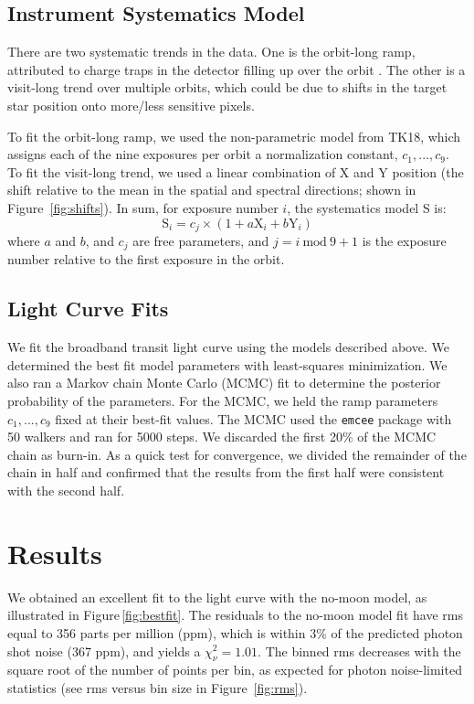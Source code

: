 \documentclass[twocolumn]{aastex62}
\newcommand{\Mod}[1]{\ \mathrm{mod}\ #1}
\begin{document}
\subsection{Instrument Systematics Model}
There are two systematic trends in the data. One is the orbit-long ramp, attributed to charge traps in the detector filling up over the orbit \citep{zhou17}. The other is a visit-long trend over multiple orbits, which could be due to shifts in the target star position onto more/less sensitive pixels.

To fit the orbit-long ramp, we used the non-parametric model from TK18, which assigns each of the nine exposures per orbit a normalization constant, $c_1, ..., c_9$. To fit the visit-long trend, we used a linear combination of X and Y position (the shift relative to the mean in the spatial and spectral directions; shown in Figure~\ref{fig:shifts}).  In sum, for exposure number $i$, the systematics model S is:
\begin{equation}
\label{eq:sys}
    \mathrm{S}_i = c_{j}\times(1 + a\mathrm{X}_i + b\mathrm{Y}_i) 
\end{equation}
where $a$ and $b$, and $c_j$ are free parameters, and $j = i\Mod9 + 1$ is the exposure number relative to the first exposure in the orbit.


\subsection{Light Curve Fits}
We fit the broadband transit light curve using the models described above.  We determined the best fit model parameters with least-squares minimization.  We also ran a Markov chain Monte Carlo (MCMC) fit to determine the posterior probability of the parameters. For the MCMC, we held the ramp parameters $c_1, ..., c_9$ fixed at their best-fit values.  The MCMC used the \texttt{emcee} package \citep{foremanmackey13} with 50 walkers and ran for 5000 steps. We discarded the first 20\% of the MCMC chain as burn-in. As a quick test for convergence, we divided the remainder of the chain in half and confirmed that the results from the first half were consistent with the second half.


\section{Results}
We obtained an excellent fit to the light curve with the no-moon model, as illustrated in  Figure\,\ref{fig:bestfit}. The residuals to the no-moon model fit have rms equal to 356 parts per million (ppm), which is within 3\% of the predicted photon shot noise (367 ppm), and yields a $\chi_\nu^2 = 1.01$. The binned rms decreases with the square root of the number of points per bin, as expected for photon noise-limited statistics (see rms versus bin size in Figure~\ref{fig:rms}).
\end{document}
